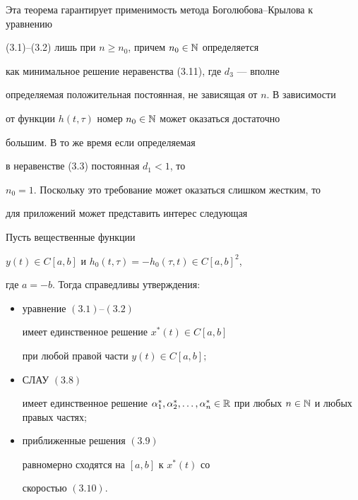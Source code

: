 Эта теорема гарантирует применимость метода Боголюбова--Крылова к уравнению


(3.1)--(3.2) лишь при $n\geq n_0$, причем $n_0\in \Bbb N$ определяется


как минимальное решение неравенства (3.11), где $d_3$ --- вполне


определяемая положительная постоянная, не зависящая от $n$. В зависимости


от функции $h(t,\tau)$ номер $n_0\in \Bbb N$ может оказаться достаточно


большим. В то же время если определяемая 


в неравенстве (3.3) постоянная $d_1<1$, то


$n_0=1$. Поскольку это требование может оказаться слишком жестким, то


для приложений может представить интерес следующая





\begin{thms}


Пусть вещественные функции


$y(t)\in C[a,b]$ и $h_0(t,\tau)=-h_0(\tau,t)\in C[a,b]^2$,


где $a=-b$. Тогда справедливы утверждения\/${:}$


\begin{itemize}


\item[а)] уравнение $(3.1)$--$(3.2)$


имеет единственное решение $x^*(t)\in C[a,b]$


при любой правой части $y(t)\in C[a,b];$


\item[б)] СЛАУ $(3.8)$


имеет единственное решение $\alpha_1^*,\alpha_2^*,\dotsc ,


\alpha_n^*\in \Bbb{R}$ при любых $n\in \bl{N}$ и любых правых частях\/$;$


\item[в)] приближенные решения $(3.9)$


равномерно сходятся на $[a,b]$ к $x^*(t)$ со


скоростью $(3.10)$.


\end{itemize}


\end{thms}





